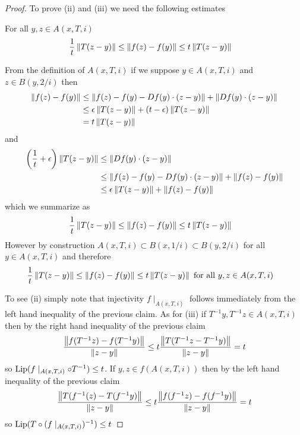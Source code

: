 \begin{proof}
To prove (ii) and (iii) we need the following estimates
\begin{clm} For all $y,z \in A(x,T,i)$
\begin{align*} 
\frac{1}{t} \left \lVert T(z-y) \right \rVert  &\leq \left \lVert f(z) - f(y) \right \rVert  \leq  t\left \lVert T(z-y) \right \rVert 
\end{align*}
\end{clm}
From the definition of $A(x,T,i)$ if we suppose $y \in A(x,T,i)$ and $z \in B(y,2/i)$ then
\begin{align*}
\left \lVert f(z) - f(y) \right \rVert &\leq \left \lVert f(z) - f(y) - Df(y) \cdot (z-y) \right \rVert + \left \lVert Df(y) \cdot (z-y) \right \rVert \\
&\leq \epsilon \left \lVert T(z-y) \right \rVert + (t - \epsilon) \left \lVert T(z-y) \right \rVert \\
&= t\left \lVert T(z-y) \right \rVert
\end{align*}
and
\begin{align*}
\left( \frac{1}{t} + \epsilon \right) \left \lVert T(z-y) \right \rVert &\leq \left \lVert Df(y) \cdot (z-y) \right \rVert \\
&\leq \left \lVert f(z) - f(y) - Df(y) \cdot (z-y) \right \rVert + \left \lVert f(z) - f(y) \right \rVert \\
&\leq \epsilon \left \lVert T(z-y) \right \rVert + \left \lVert f(z) - f(y) \right \rVert 
\end{align*}
which we summarize as
\begin{align*}
\frac{1}{t} \left \lVert T(z-y) \right \rVert  &\leq \left \lVert f(z) - f(y) \right \rVert  \leq  t\left \lVert T(z-y) \right \rVert
\end{align*}
However by construction $A(x,T,i) \subset B(x,1/i) \subset B(y,2/i)$ for all $y \in A(x,T,i)$ and therefore 
\begin{align*}
\frac{1}{t} \left \lVert T(z-y) \right \rVert  &\leq \left \lVert f(z) - f(y) \right \rVert  \leq  t\left \lVert T(z-y) \right \rVert \text{ for all $y,z \in A(x,T,i)$}
\end{align*}

To see (ii) simply note that injectivity $f \mid_{A(x,T,i)}$ follows
immediately from the left hand inequality of the previous claim.  As for (iii) if $T^{-1} y, T^{-1} z \in A(x,T,i)$ then by 
the right hand inequality of the previous claim
\begin{align*}
\frac{\left \lVert f(T^{-1} z) - f(T^{-1} y) \right \rVert}{\left \lVert z - y \right \rVert} \leq  t\frac{\left \lVert T(T^{-1} z-T^{-1} y) \right \rVert}{\left \lVert z - y \right \rVert} = t
\end{align*}
so $\operatorname*{Lip}(f \mid_{A(x,T,i)} \circ T^{-1}) \leq t$.   If $y,z \in f(A(x,T,i))$ then by the left hand inequality of the previous claim
\begin{align*}
\frac{\left \lVert T (f^{-1}(z) - T(f^{-1} y) \right \rVert}{\left \lVert z - y \right \rVert} \leq  t\frac{\left \lVert f(f^{-1} z)-f(f^{-1} y) \right \rVert}{\left \lVert z - y \right \rVert} = t
\end{align*}
so $\operatorname*{Lip}(T \circ (f\mid_{A(x,T,i)})^{-1}) \leq t$
\end{proof}


